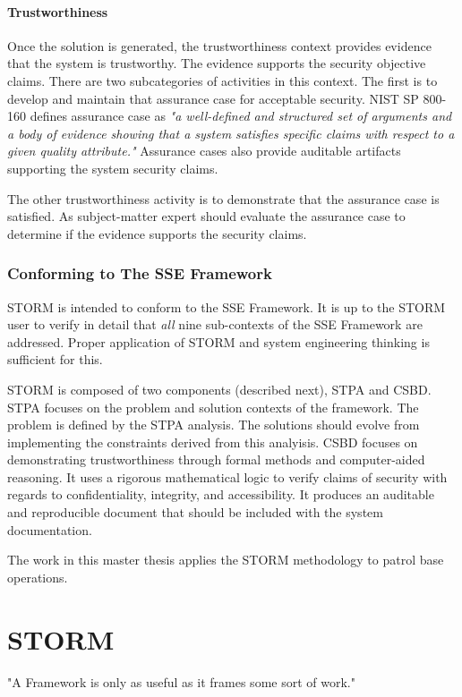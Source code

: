 \documentclass[../../main/main.tex]{subfiles}
\begin{document}
\paragraph*{Trustworthiness}
Once the solution is generated, the trustworthiness context provides evidence that the system is trustworthy.  The evidence supports the security objective claims.  There are two subcategories of activities in this context.  The first is to develop and maintain that assurance case for acceptable security.  NIST SP 800-160 defines assurance case as \textit{"a well-defined and structured set of arguments and a body of evidence showing that a system satisfies specific claims with respect to a given quality attribute."}  Assurance cases also provide auditable artifacts supporting the system security claims.

The other trustworthiness activity is to demonstrate that the assurance case is satisfied.  As subject-matter expert should evaluate the assurance case to determine if the evidence supports the security claims.

\subsubsection{Conforming to The SSE Framework}
STORM is intended to conform to the SSE Framework.  It is up to the STORM user to verify in detail that \textit{all} nine sub-contexts of the SSE Framework are addressed.  Proper application of STORM and system engineering thinking is sufficient for this.

STORM is composed of two components (described next), STPA and CSBD.  STPA focuses on the problem and solution contexts of the framework.  The problem is defined by the STPA analysis.  The solutions should evolve from implementing the constraints derived from this analyisis. CSBD focuses on demonstrating trustworthiness through formal methods and computer-aided reasoning.  It uses a rigorous mathematical logic to verify claims of security with regards to confidentiality, integrity, and accessibility.  It produces an auditable and reproducible document that should be included with the system documentation.

The work in this master thesis applies the STORM methodology to patrol base operations. 


\section{STORM}\label{sec:storm}
"A Framework is only as useful as it frames some sort of work."
\end{document}
